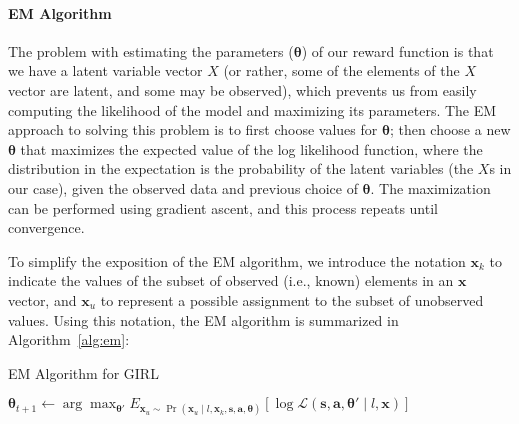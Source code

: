 
\vspace{\up}
\paragraph{EM Algorithm}

The problem with estimating the parameters ($\bm{\theta}$) of our
reward function is that we have a latent variable vector $X$ (or
rather, some of the elements of the $X$ vector are latent, and some
may be observed), which prevents us from easily computing the
likelihood of the model and maximizing its parameters.  The EM
approach to solving this problem is to first choose values for
$\bm{\theta}$; then choose a new $\bm{\theta}$ that maximizes the
expected value of the log likelihood function, where the distribution
in the expectation is the probability of the latent variables (the
$X$s in our case), given the observed data and previous choice of
$\bm{\theta}$. The maximization can be performed using gradient
ascent, and this process repeats until convergence.

To simplify the exposition of the EM algorithm, we introduce the
notation $\bm{x}_k$ to indicate the values of the subset of observed
(i.e., known) elements in an $\bm{x}$ vector, and $\bm{x}_u$ to
represent a possible assignment to the subset of unobserved values.
Using this notation, the EM algorithm is summarized in
Algorithm~\ref{alg:em}:

\begin{algorithm}
\caption{EM Algorithm for GIRL}
\begin{algorithmic}
\State $\bm{\theta}_{t+1} \gets \arg \max_{\bm{\theta'}} E_{\bm{x}_u \sim \Pr(\bm{x}_u \mid l, \bm{x}_k, \bm{s}, \bm{a}, \bm{\theta})} \left[ \log\mathcal{L}(\bm{s}, \bm{a}, \bm{\theta}' \mid l, \bm{x}) \right]$
\EndFor
\end{algorithmic}
\label{alg:em}
\end{algorithm}

